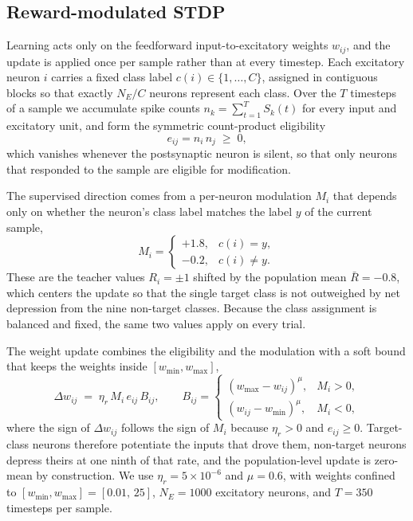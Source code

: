 \subsection{Reward-modulated STDP}

Learning acts only on the feedforward input-to-excitatory weights $w_{ij}$, and the
update is applied once per sample rather than at every timestep. Each excitatory
neuron $i$ carries a fixed class label $c(i) \in \{1, \dots, C\}$, assigned in
contiguous blocks so that exactly $N_E / C$ neurons represent each class. Over the
$T$ timesteps of a sample we accumulate spike counts $n_k = \sum_{t=1}^{T} S_k(t)$
for every input and excitatory unit, and form the symmetric count-product
eligibility
\begin{equation}
  e_{ij} = n_i \, n_j \;\geq\; 0 ,
\end{equation}
which vanishes whenever the postsynaptic neuron is silent, so that only neurons
that responded to the sample are eligible for modification.

The supervised direction comes from a per-neuron modulation $M_i$ that depends
only on whether the neuron's class label matches the label $y$ of the current
sample,
\begin{equation}
  M_i =
  \begin{cases}
    +1.8, & c(i) = y, \\[2pt]
    -0.2, & c(i) \neq y .
  \end{cases}
\end{equation}
These are the teacher values $R_i = \pm 1$ shifted by the population mean
$\bar{R} = -0.8$, which centers the update so that the single target class is not
outweighed by net depression from the nine non-target classes. Because the class
assignment is balanced and fixed, the same two values apply on every trial.

The weight update combines the eligibility and the modulation with a soft bound
that keeps the weights inside $[w_{\min}, w_{\max}]$,
\begin{equation}
  \Delta w_{ij} \;=\; \eta_r \, M_i \, e_{ij} \, B_{ij},
  \qquad
  B_{ij} =
  \begin{cases}
    (w_{\max} - w_{ij})^{\mu}, & M_i > 0, \\[2pt]
    (w_{ij} - w_{\min})^{\mu}, & M_i < 0,
  \end{cases}
\end{equation}
where the sign of $\Delta w_{ij}$ follows the sign of $M_i$ because $\eta_r > 0$ and
$e_{ij} \geq 0$. Target-class neurons therefore potentiate the inputs that drove
them, non-target neurons depress theirs at one ninth of that rate, and the
population-level update is zero-mean by construction. We use $\eta_r = 5 \times 10^{-6}$ and $\mu = 0.6$, with weights confined to
$[w_{\min}, w_{\max}] = [0.01,\, 25]$, $N_E = 1000$ excitatory neurons, and $T = 350$
timesteps per sample.
